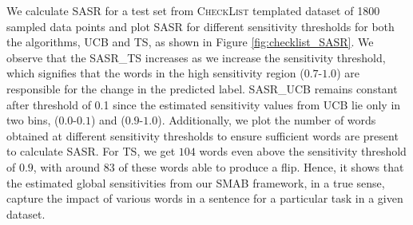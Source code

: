 We calculate SASR for a test set from \textsc{CheckList} templated dataset of 1800 sampled data points and plot SASR for different sensitivity thresholds for both the algorithms, UCB and TS, as shown in Figure \ref{fig:checklist_SASR}. We observe that the SASR\_TS increases as we increase the sensitivity threshold, which signifies that the words in the high sensitivity region ($0.7$-$1.0$) are responsible for the change in the predicted label. SASR\_UCB remains constant after threshold of 0.1 since the estimated sensitivity values from UCB lie only in two bins, ($0.0$-$0.1$) and ($0.9$-$1.0$). Additionally, we plot the number of words obtained at different sensitivity thresholds to ensure sufficient words are present to calculate SASR. For TS, we get $104$ words even above the sensitivity threshold of $0.9$, with around $83$ of these words able to produce a flip. Hence, it shows that the estimated global sensitivities from our SMAB framework, in a true sense, capture the impact of various words in a sentence for a particular task in a given dataset.
